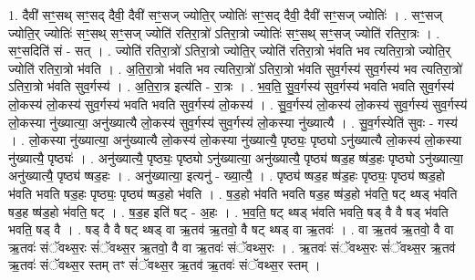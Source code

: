 \documentclass[17pt]{extarticle}
\begin{document}
1. दैवी॑ सꣳ॒॒सथ् सꣳ॒॒सद् दैवी॒ दैवी॑ सꣳ॒॒सज् ज्योति॒र् ज्योतिः॑ सꣳ॒॒सद् दैवी॒ दैवी॑ सꣳ॒॒सज् ज्योतिः॑ । . सꣳ॒॒सज् ज्योति॒र् ज्योतिः॑ सꣳ॒॒सथ् सꣳ॒॒सज् ज्योति॑ रतिरा॒त्रो॑ ऽतिरा॒त्रो ज्योतिः॑ सꣳ॒॒सथ् सꣳ॒॒सज् ज्योति॑ रतिरा॒त्रः । . सꣳ॒॒सदिति॑ सं - सत् । . ज्योति॑ रतिरा॒त्रो॑ ऽतिरा॒त्रो ज्योति॒र् ज्योति॑ रतिरा॒त्रो भ॑वति भव त्यतिरा॒त्रो ज्योति॒र् ज्योति॑ रतिरा॒त्रो भ॑वति । . अ॒ति॒रा॒त्रो भ॑वति भव त्यतिरा॒त्रो॑ ऽतिरा॒त्रो भ॑वति सुव॒र्गस्य॑ सुव॒र्गस्य॑ भव त्यतिरा॒त्रो॑ ऽतिरा॒त्रो भ॑वति सुव॒र्गस्य॑ । . अ॒ति॒रा॒त्र इत्य॑ति - रा॒त्रः । . भ॒व॒ति॒ सु॒व॒र्गस्य॑ सुव॒र्गस्य॑ भवति भवति सुव॒र्गस्य॑ लो॒कस्य॑ लो॒कस्य॑ सुव॒र्गस्य॑ भवति भवति सुव॒र्गस्य॑ लो॒कस्य॑ । . सु॒व॒र्गस्य॑ लो॒कस्य॑ लो॒कस्य॑ सुव॒र्गस्य॑ सुव॒र्गस्य॑ लो॒कस्या नु॑ख्यात्या॒ अनु॑ख्यात्यै लो॒कस्य॑ सुव॒र्गस्य॑ सुव॒र्गस्य॑ लो॒कस्या नु॑ख्यात्यै । . सु॒व॒र्गस्येति॑ सुवः - गस्य॑ । . लो॒कस्या नु॑ख्यात्या॒ अनु॑ख्यात्यै लो॒कस्य॑ लो॒कस्या नु॑ख्यात्यै॒ पृष्ठ्यः॒ पृष्ठ्यो ऽनु॑ख्यात्यै लो॒कस्य॑ लो॒कस्या नु॑ख्यात्यै॒ पृष्ठ्यः॑ । . अनु॑ख्यात्यै॒ पृष्ठ्यः॒ पृष्ठ्यो ऽनु॑ख्यात्या॒ अनु॑ख्यात्यै॒ पृष्ठ्य॑ ष्षड॒ह ष्ष॑ड॒हः पृष्ठ्यो ऽनु॑ख्यात्या॒ अनु॑ख्यात्यै॒ पृष्ठ्य॑ ष्षड॒हः । . अनु॑ख्यात्या॒ इत्यनु॑ - ख्या॒त्यै॒ । . पृष्ठ्य॑ ष्षड॒ह ष्ष॑ड॒हः पृष्ठ्यः॒ पृष्ठ्य॑ ष्षड॒हो भ॑वति भवति षड॒हः पृष्ठ्यः॒ पृष्ठ्य॑ ष्षड॒हो भ॑वति । . ष॒ड॒हो भ॑वति भवति षड॒ह ष्ष॑ड॒हो भ॑वति॒ षट् थ्षड् भ॑वति षड॒ह ष्ष॑ड॒हो भ॑वति॒ षट् । . ष॒ड॒ह इति॑ षट् - अ॒हः । . भ॒व॒ति॒ षट् थ्षड् भ॑वति भवति॒ षड् वै वै षड् भ॑वति भवति॒ षड् वै । . षड् वै वै षट् थ्षड् वा ऋ॒तव॑ ऋ॒तवो॒ वै षट् थ्षड् वा ऋ॒तवः॑ । . वा ऋ॒तव॑ ऋ॒तवो॒ वै वा ऋ॒तवः॑ संॅवथ्स॒रः सं॑ॅवथ्स॒र ऋ॒तवो॒ वै वा ऋ॒तवः॑ संॅवथ्स॒रः । . ऋ॒तवः॑ संॅवथ्स॒रः सं॑ॅवथ्स॒र ऋ॒तव॑ ऋ॒तवः॑ संॅवथ्स॒र स्तम् तꣳ सं॑ॅवथ्स॒र ऋ॒तव॑ ऋ॒तवः॑ संॅवथ्स॒र स्तम् । \newline
\end{document}
